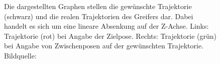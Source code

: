 \begin{figure}[h]
	\centering
	\hfill
	\caption[Trajektorien des Greifers]{Die dargestellten Graphen stellen die gewünschte Trajektorie (schwarz) und die realen Trajektorien des Greifers dar. Dabei handelt es sich um eine lineare Absenkung auf der Z-Achse. Links: Trajektorie (rot) bei Angabe der Zielpose. Rechts: Trajektorie (grün) bei Angabe von Zwischenposen auf der gewünschten Trajektorie. Bildquelle: \cite{muggler2013torque}}	
	\label{fig:traj}
\end{figure}

